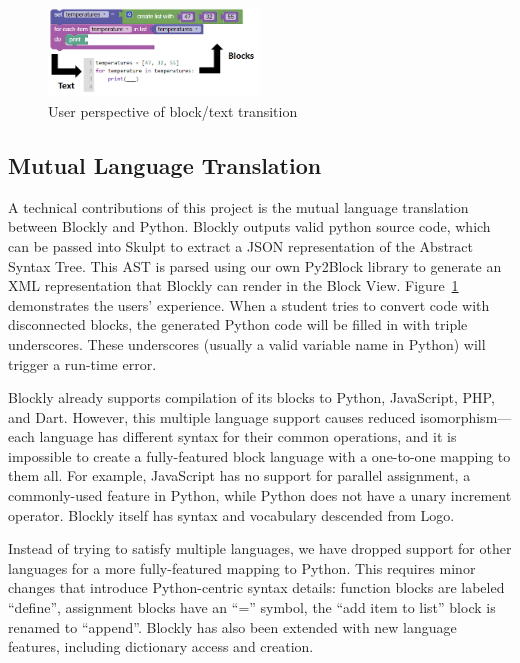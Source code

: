 \documentclass[10pt, conference, compsocconf]{IEEEtran}
\begin{document}
\begin{figure}
\includegraphics[width=0.5\textwidth]{images/mltExample-2}
\caption{User perspective of block/text transition}
\label{fig-mlt-user}
\end{figure}

\subsection{Mutual Language Translation} \label{MLT-description}

A technical contributions of this project is the mutual language translation between Blockly and Python.
Blockly outputs valid python source code, which can be passed into Skulpt to extract a JSON representation of the Abstract Syntax Tree.
This AST is parsed using our own Py2Block library to generate an XML representation that Blockly can render in the Block View.
Figure~\ref{fig-mlt-user} demonstrates the users' experience.
When a student tries to convert code with disconnected blocks, the generated Python code will be filled in with triple underscores.
These underscores (usually a valid variable name in Python) will trigger a run-time error.

Blockly already supports compilation of its blocks to Python, JavaScript, PHP, and Dart.
However, this multiple language support causes reduced isomorphism---each language has different syntax for their common operations, and it is impossible to create a fully-featured block language with a one-to-one mapping to them all.
For example, JavaScript has no support for parallel assignment, a commonly-used feature in Python, while Python does not have a unary increment operator.
Blockly itself has syntax and vocabulary descended from Logo.

Instead of trying to satisfy multiple languages, we have dropped support for other languages for a more fully-featured mapping to Python.
This requires minor changes that introduce Python-centric syntax details:
function blocks are labeled ``define'', assignment blocks have an ``='' symbol, the ``add item to list'' block is renamed to ``append''.
Blockly has also been extended with new language features, including dictionary access and creation.
\end{document}

